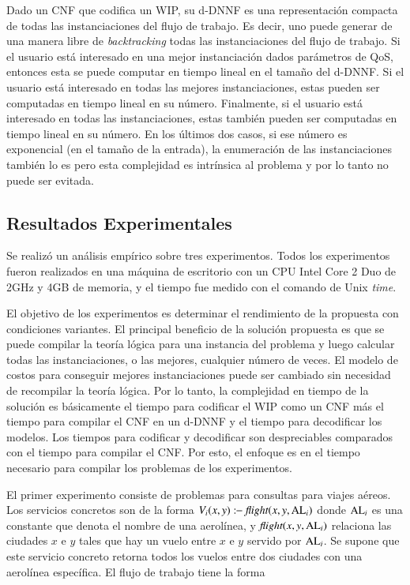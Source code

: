 Dado un CNF que codifica un WIP, su d-DNNF es una representación compacta de
todas las instanciaciones del flujo de trabajo. Es decir, uno puede generar de
una manera libre de \emph{backtracking} todas las instanciaciones del flujo de
trabajo. Si el usuario está interesado en una mejor instanciación dados
parámetros de QoS, entonces esta se puede computar en tiempo lineal en el tamaño
del d-DNNF. Si el usuario está interesado en todas las mejores instanciaciones,
estas pueden ser computadas en tiempo lineal en su número. Finalmente, si el
usuario está interesado en todas las instanciaciones, estas también pueden ser
computadas en tiempo lineal en su número. En los últimos dos casos, si ese
número es exponencial (en el tamaño de la entrada), la enumeración de las
instanciaciones también lo es pero esta complejidad es intrínsica al problema y
por lo tanto no puede ser evitada.

\subsection{Resultados Experimentales}

Se realizó un análisis empírico sobre tres experimentos. Todos los experimentos
fueron realizados en una máquina de escritorio con un CPU Intel Core 2 Duo de
2GHz y 4GB de memoria, y el tiempo fue medido con el comando de Unix
\emph{time}.

El objetivo de los experimentos es determinar el rendimiento de la propuesta con
condiciones variantes. El principal beneficio de la solución propuesta es
que se puede compilar la teoría lógica para una instancia del problema y luego
calcular todas las instanciaciones, o las mejores, cualquier número de veces. El
modelo de costos para conseguir mejores instanciaciones puede ser cambiado sin
necesidad de recompilar la teoría lógica. Por lo tanto, la complejidad en tiempo
de la solución es básicamente el tiempo para codificar el WIP como un
CNF más el tiempo para compilar el CNF en un d-DNNF y el tiempo para decodificar
los modelos. Los tiempos para codificar y decodificar son despreciables
comparados con el tiempo para compilar el CNF. Por esto, el enfoque es en el tiempo
necesario para compilar los problemas de los experimentos.

El primer experimento consiste de problemas para consultas para viajes aéreos.
Los servicios concretos son de la forma $V_i(x,y):\!\!-\ \text{\it flight}(x,y,\text{AL}_i)$
donde $\text{AL}_i$ es una
constante que denota el nombre de una aerolínea, y $\text{\it flight}(x,y,\text{AL}_i)$ relaciona las
ciudades $x$ e $y$ tales que hay un vuelo entre $x$ e $y$ servido por $\text{AL}_i$.
Se supone que este servicio concreto retorna todos los vuelos entre dos ciudades
con una aerolínea específica. El flujo de trabajo tiene la forma

